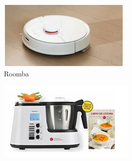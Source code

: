 \begin{figure}[!h]
  \begin{subfigure}[b]{0.3\textwidth}
    \includegraphics[width=\textwidth, height=\textwidth]{roomba.png}
    \caption{Roomba}
  \end{subfigure}
    \hfill
  \begin{subfigure}[b]{0.3\textwidth}
    \includegraphics[width=\textwidth, height=\textwidth]{thermomix.png}

\end{subfigure}
\end{figure}
